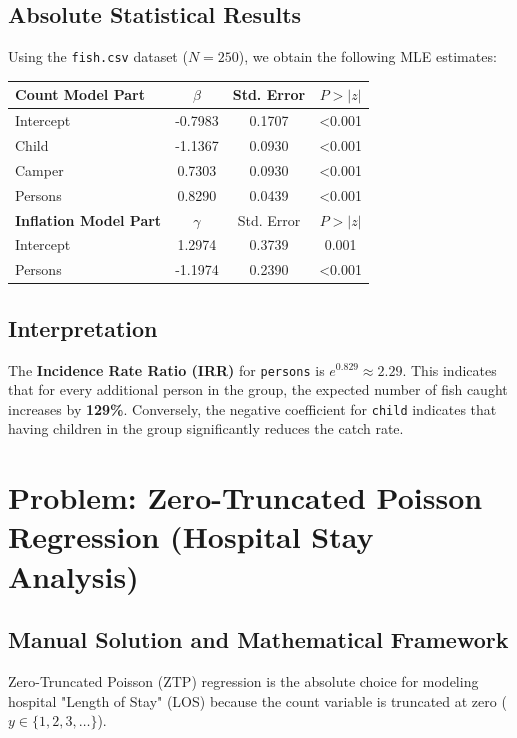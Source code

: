 \documentclass[12pt]{article}
\begin{document}
\subsection{Absolute Statistical Results}
Using the \texttt{fish.csv} dataset ($N=250$), we obtain the following MLE estimates:

\begin{table}[h!]
\centering
\begin{tabular}{lccc}
\toprule
\textbf{Count Model Part} & $\beta$ & Std. Error & $P > |z|$ \\ \midrule
Intercept & -0.7983 & 0.1707 & <0.001 \\
Child & -1.1367 & 0.0930 & <0.001 \\
Camper & 0.7303 & 0.0930 & <0.001 \\
Persons & 0.8290 & 0.0439 & <0.001 \\ \midrule
\textbf{Inflation Model Part} & $\gamma$ & Std. Error & $P > |z|$ \\ \midrule
Intercept & 1.2974 & 0.3739 & 0.001 \\
Persons & -1.1974 & 0.2390 & <0.001 \\ \bottomrule
\end{tabular}
\end{table}

\subsection{Interpretation}
The \textbf{Incidence Rate Ratio (IRR)} for \texttt{persons} is $e^{0.829} \approx 2.29$. This indicates that for every additional person in the group, the expected number of fish caught increases by \textbf{129\%}. Conversely, the negative coefficient for \texttt{child} indicates that having children in the group significantly reduces the catch rate.

\newpage
\section{Problem: Zero-Truncated Poisson Regression (Hospital Stay Analysis)}
\label{prob_ztp}

\subsection{Manual Solution and Mathematical Framework}
Zero-Truncated Poisson (ZTP) regression is the absolute choice for modeling hospital "Length of Stay" (LOS) because the count variable is truncated at zero ($y \in \{1, 2, 3, \dots\}$).
\end{document}
